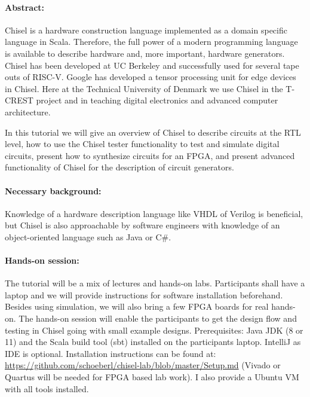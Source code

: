 \documentclass{article}
\begin{document}
\paragraph{Abstract:}

Chisel is a hardware construction language implemented as a domain specific language in Scala. Therefore, the full power of a modern programming language is available to describe hardware and, more important, hardware generators. Chisel has been developed at UC Berkeley and successfully used for several tape outs of RISC-V. Google has developed a tensor processing unit for edge devices in Chisel. Here at the Technical University of Denmark we use Chisel in the T-CREST project and in teaching digital electronics and advanced computer architecture.

In this tutorial we will give an overview of Chisel to describe circuits at the RTL level, how to use the Chisel tester functionality to test and simulate digital circuits, present how to synthesize circuits for an FPGA, and present advanced functionality of Chisel for the description of circuit generators.

 \paragraph{Necessary background:}

Knowledge of a hardware description language like VHDL of Verilog is beneficial, but Chisel is also
approachable by software engineers with knowledge of an object-oriented language such as Java or C\#.


 \paragraph{Hands-on session:}
 The tutorial will be a mix of lectures and hands-on labs. Participants shall have a laptop and we will provide
instructions for software installation beforehand.
Besides using simulation, we will also bring a few FPGA boards for
real hands-on.
 The hands-on session will enable the participants to get the design
 flow and testing in Chisel going with small example designs.
 Prerequisites: Java JDK (8 or 11) and the Scala build tool (sbt) installed on the participants laptop.
 IntelliJ as IDE is optional. Installation instructions can be found
at: \url{https://github.com/schoeberl/chisel-lab/blob/master/Setup.md} (Vivado or Quartus
will be needed for FPGA based lab work).
I also provide a Ubuntu VM with all tools installed.
\end{document}

